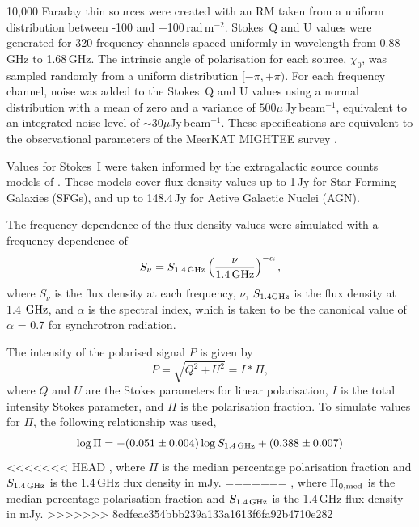 \documentclass[fleqn,usenatbib]{mnras}
\begin{document}

10,000 Faraday thin sources were created with an RM taken from a uniform distribution between -100 and +100\,rad\,m$^{-2}$. Stokes~Q and U values were generated for 320 frequency channels spaced uniformly in wavelength from 0.88\,GHz to 1.68\,GHz. The intrinsic angle of polarisation for each source, $\chi_0$, was sampled randomly from a uniform distribution $[-\pi, +\pi)$.
For each frequency channel, noise was added to the Stokes~Q and U values using a normal distribution with a mean of zero and a variance of $500\mu$\,Jy\,beam$^{-1}$, equivalent to an integrated noise level of $\sim 30\mu$Jy\,beam$^{-1}$. These specifications are equivalent to the observational parameters of the MeerKAT MIGHTEE survey \citep{Taylor_2017}.

Values for Stokes~I were taken informed by the extragalactic source counts models of \cite{dezotti}. These models cover flux density values up to 1\,Jy for Star Forming Galaxies (SFGs), and up to 148.4\,Jy for Active Galactic Nuclei (AGN).

The frequency-dependence of the flux density values were simulated with a frequency dependence of
%
\begin{equation}
\label{FreqDependent}
S_{\nu} = S_{\rm 1.4\,GHz}\left(\frac{\nu}{\rm 1.4\,GHz} \right)^{-\alpha},
\end{equation}
%
where $S_\nu$ is the flux density at each frequency, $\nu$, $S_{1.4\rm{GHz}}$ is the flux density at 1.4 $\rm{GHz}$, and $\alpha$ is the spectral index, which is taken to be the canonical value of $\alpha$ = 0.7 for synchrotron radiation.

The intensity of the polarised signal $P$ is given by
%
\begin{equation}
\label{eq:PolarisedSignal}
P = \sqrt{Q^2 + U^2} = I*\Pi,
\end{equation}
%
where $Q$ and $U$ are the Stokes parameters for linear polarisation, $I$ is the total intensity Stokes parameter, and $\Pi$ is the polarisation fraction. To simulate values for $\Pi$, the following relationship was used,
%
\begin{equation}
\label{eq:StilEquation}
\log \Pi = -(0.051\pm0.004) \log S_{\rm 1.4\,GHz} + (0.388\pm0.007)
\end{equation}
%
<<<<<<< HEAD
\citep{Stil_2014}, where $\Pi$ is the median percentage polarisation fraction and $S_{\rm 1.4\,GHz}$ is the 1.4\,GHz flux density in mJy. 
=======
\citep{Stil_2014}, where $\Pi_{0, {\rm med}}$ is the median percentage polarisation fraction and $S_{\rm 1.4\,GHz}$ is the 1.4\,GHz flux density in mJy.
>>>>>>> 8cdfeac354bbb239a133a1613f6fa92b4710e282
\end{document}
